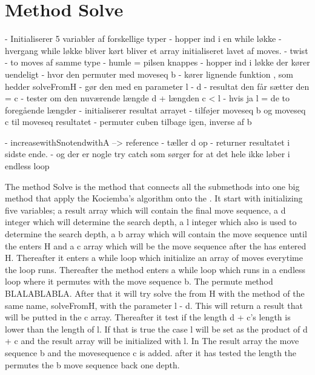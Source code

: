 \section{Method Solve}

- Initialiserer 5 variabler af forskellige typer
- hopper ind i en while l\o{}kke
- hvergang while l\o{}kke bliver k\o{}rt bliver et array initialiseret lavet af moves.
- twist
- to moves af samme type
-  humle = pilsen knappes
- hopper ind i l\o{}kke der k\o{}rer uendeligt
- hvor den permuter med moveseq b
- k\o{}rer lignende funktion , som hedder solveFromH
- g\o{}r den med en parameter l - d
- resultat den f\aa{}r s\ae{}tter den = c
- tester om den nuv\ae{}rende l\ae{}ngde d + l\ae{}ngden c < l
- hvis ja l = de to foreg\aa{}ende l\ae{}ngder
- initialiserer resultat arrayet
- tilf\o{}jer moveseq b og moveseq c til moveseq resultatet
- permuter cuben tilbage igen, inverse af b

- increasewithSnotendwithA --> reference
- t\ae{}ller d op
- returner resultatet i sidste ende.
-  og der er nogle try catch som s\o{}rger for at det hele ikke l\o{}ber i endless loop

The method Solve is the method that connects all the submethods into one big method that apply the Kociemba's algorithm onto the \rubik{}. It start with initializing five variables; a result array which will contain the final move sequence, a d integer which will determine the search depth, a l integer which also is used to determine the search depth, a b array which will contain the move sequence until the \rubik{} enters H and a c array which will be the move sequence after the \rubik{} has entered H. Thereafter it enters a while loop which initialize an array of moves everytime the loop runs. Thereafter the method enters a while loop which runs in a endless loop where it permutes with the move sequence b. The permute method BLALABLABLA. After that it will try solve the \rubik{} from H with the method of the same name, solveFromH, with the parameter l - d.  This will return a result that will be putted in the c array. Thereafter it test if the length d + c's length is lower than the length of l. If that is true the case l will be set as the product of d + c and the result array will be initialized with l. In The result array the move sequence b and the movesequence c is added. after it has tested the length the \rubik{}  permutes the b move sequence back one depth.




